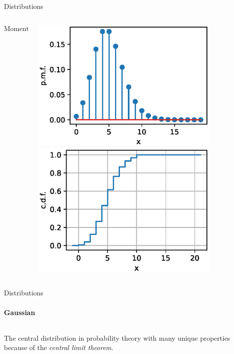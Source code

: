 {\begin{frame}{Distributions}
\begin{columns}[onlytextwidth]
\begin{column}{0.57\textwidth}
\begin{boxed}
                    $$\text{Moments:}\qquad \displaystyle \mu_X = \lambda \quad \sigma_X^2 = \lambda$$
                \end{boxed}
            \end{column}
            \begin{column}{0.43\textwidth}
                \begin{center}
                    \includegraphics[width=0.8\textwidth]{fig/prob_poisson_pmf.eps}
                    \includegraphics[width=0.8\textwidth]{fig/prob_poisson_cdf.eps}
                \end{center}
            \end{column}
        \end{columns}
    \end{frame}

    \begin{frame}{Distributions}
        \framesubtitle{Gaussian}

        \begin{columns}[onlytextwidth]
            \begin{column}{0.55\textwidth}
                The central distribution in probability theory with many unique properties because of
                the \emph{central limit theorem}.\\[1mm]


\end{column}
\end{columns}
\end{frame}}
